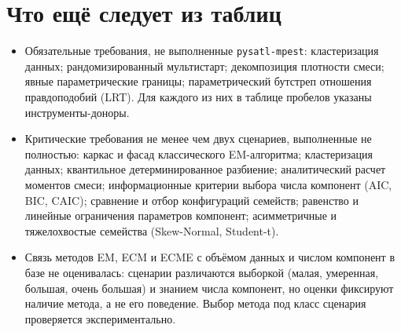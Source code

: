 \documentclass[10pt,a4paper]{article}
\begin{document}
\section{Что ещё следует из таблиц}
\begin{itemize}
\item Обязательные требования, не выполненные \texttt{pysatl-mpest}: кластеризация данных; рандомизированный мультистарт; декомпозиция плотности смеси; явные параметрические границы; параметрический бутстреп отношения правдоподобий (LRT). Для каждого из них в таблице пробелов указаны инструменты-доноры.
\item Критические требования не менее чем двух сценариев, выполненные не полностью: каркас и фасад классического EM-алгоритма; кластеризация данных; квантильное детерминированное разбиение; аналитический расчет моментов смеси; информационные критерии выбора числа компонент (AIC, BIC, CAIC); сравнение и отбор конфигураций семейств; равенство и линейные ограничения параметров компонент; асимметричные и тяжелохвостые семейства (Skew-Normal, Student-t).
\item Связь методов EM, ECM и ECME с объёмом данных и числом компонент в базе не оценивалась: сценарии различаются выборкой
(малая, умеренная, большая, очень большая) и знанием числа компонент, но оценки фиксируют наличие метода, а не его поведение.
Выбор метода под класс сценария проверяется экспериментально.
\end{itemize}
\end{document}
